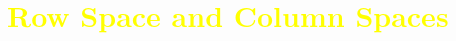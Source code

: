 \documentclass[pdf,9pt]{beamer}
\date{Chapter 5. Vector Space $\R^n$ \\ \S 5-4. Rank of a Matrix}
\begin{document}







\begin{frame}[fragile]
   \tableofcontents
\end{frame}
\section[\textcolor{yellow}{}]{\textcolor{yellow}{Row Space and Column Spaces}}
\end{document}
